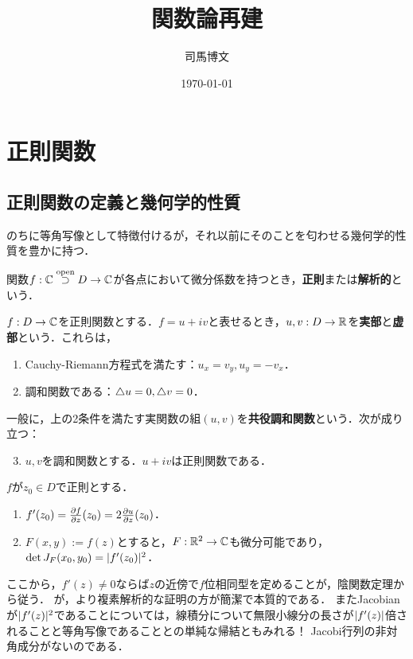 \documentclass[uplatex, dvipdfmx]{jsreport}
\title{関数論再建}
\author{司馬博文}
\date{\today}
\begin{document}
\tableofcontents

\chapter{正則関数}

\section{正則関数の定義と幾何学的性質}

\begin{tcolorbox}[colframe=ForestGreen, colback=ForestGreen!10!white,breakable,colbacktitle=ForestGreen!40!white,coltitle=black,fonttitle=\bfseries\sffamily,
title=]
    のちに等角写像として特徴付けるが，それ以前にそのことを匂わせる幾何学的性質を豊かに持つ．
\end{tcolorbox}

\begin{definition}
    関数$f:\mathbb{C}\overset{\mathrm{open}}{\supset} D\to\mathbb{C}$が各点において微分係数を持つとき，\textbf{正則}または\textbf{解析的}という．
\end{definition}

\begin{lemma}[正則関数が定める実関数]
    $f:D\to\mathbb{C}$を正則関数とする．$f=u+iv$と表せるとき，$u,v:D\to\mathbb{R}$を\textbf{実部}と\textbf{虚部}という．これらは，
    \begin{enumerate}
        \item Cauchy-Riemann方程式を満たす：$u_x=v_y,u_y=-v_x$．
        \item 調和関数である：$\mathop{}\!\mathbin\bigtriangleup u=0,\mathop{}\!\mathbin\bigtriangleup v=0$．
    \end{enumerate}
    一般に，上の2条件を満たす実関数の組$(u,v)$を\textbf{共役調和関数}という．次が成り立つ：
    \begin{enumerate}\setcounter{enumi}{2}
        \item $u,v$を調和関数とする．$u+iv$は正則関数である．
    \end{enumerate}
\end{lemma}

\begin{corollary}[正則関数の微分係数の各種表現とJacobianの特徴付け]
    $f$が$z_0\in D$で正則とする．
    \begin{enumerate}
        \item $f'(z_0)=\frac{\partial f}{\partial z}(z_0)=2\frac{\partial u}{\partial z}(z_0)$．
        \item $F(x,y):=f(z)$とすると，$F:\mathbb{R}^2\to\mathbb{C}$も微分可能であり，$\det J_F(x_0,y_0)=\lvert f'(z_0)\rvert^2$．
    \end{enumerate}
\end{corollary}
\begin{remarks}[正則関数の局所可逆性について]
    ここから，$f'(z)\ne0$ならば$z$の近傍で$f$位相同型を定めることが，陰関数定理から従う．
    が，より複素解析的な証明の方が簡潔で本質的である．
    またJacobianが$\lvert f'(z)\rvert^2$であることについては，線積分について無限小線分の長さが$\lvert f'(z)\rvert$倍されることと等角写像であることとの単純な帰結ともみれる！
    Jacobi行列の非対角成分がないのである．
\end{remarks}
\end{document}
